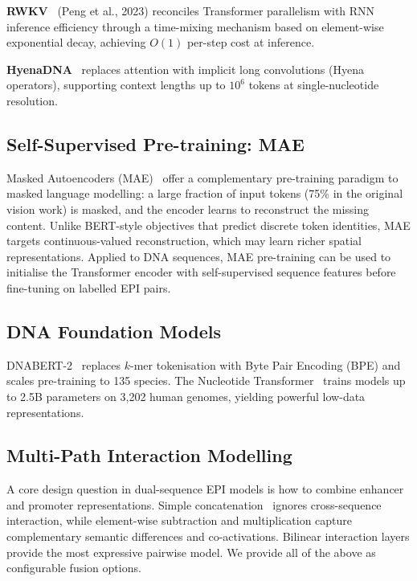 \textbf{RWKV}~\cite{rwkv} (Peng et al., 2023) reconciles Transformer parallelism
with RNN inference efficiency through a time-mixing mechanism based on element-wise
exponential decay, achieving $O(1)$ per-step cost at inference.

\textbf{HyenaDNA}~\cite{hyenadna} replaces attention with implicit long convolutions
(Hyena operators), supporting context lengths up to $10^6$ tokens at single-nucleotide
resolution.

\subsection{Self-Supervised Pre-training: MAE}

Masked Autoencoders (MAE)~\cite{mae} offer a complementary pre-training paradigm to
masked language modelling: a large fraction of input tokens (75\% in the original
vision work) is masked, and the encoder learns to reconstruct the missing content.
Unlike BERT-style objectives that predict discrete token identities, MAE targets
continuous-valued reconstruction, which may learn richer spatial representations.
Applied to DNA sequences, MAE pre-training can be used to initialise the Transformer
encoder with self-supervised sequence features before fine-tuning on labelled EPI
pairs.

\subsection{DNA Foundation Models}

DNABERT-2~\cite{dnabert2} replaces $k$-mer tokenisation with Byte Pair Encoding (BPE)
and scales pre-training to 135 species.
The Nucleotide Transformer~\cite{nucleotide_transformer} trains models up to 2.5B
parameters on 3,202 human genomes, yielding powerful low-data representations.

\subsection{Multi-Path Interaction Modelling}

A core design question in dual-sequence EPI models is how to combine enhancer and
promoter representations.
Simple concatenation~\cite{speid} ignores cross-sequence interaction, while element-wise
subtraction and multiplication capture complementary semantic differences and
co-activations.
Bilinear interaction layers provide the most expressive pairwise model.
We provide all of the above as configurable fusion options.
